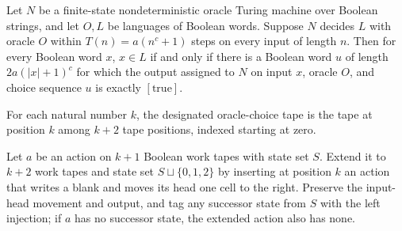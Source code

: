 \begin{theorem}
\label{Turing.FinOracleNDTM.mem_iff_exists_choiceOut}
\leanok
{}
Let $N$ be a finite-state nondeterministic oracle Turing machine over Boolean strings,
and let $O,L$ be languages of Boolean words. Suppose $N$ decides $L$ with oracle $O$
within $T(n)=a(n^c+1)$ steps on every input of length $n$. Then for every Boolean word
$x$, $x\in L$ if and only if there is a Boolean word $u$ of length $2a(|x|+1)^c$ for
which the output assigned to $N$ on input $x$, oracle $O$, and choice sequence $u$ is
exactly $[\mathrm{true}]$.
\end{theorem}

\begin{definition}
\label{Turing.oracleChoiceSlot}
\leanok
For each natural number $k$, the designated oracle-choice tape is the tape at position
$k$ among $k+2$ tape positions, indexed starting at zero.
\end{definition}

\begin{definition}
\label{Turing.oracleChoiceAction}
\leanok
{}
Let $a$ be an action on $k+1$ Boolean work tapes with state set $S$. Extend it to $k+2$
work tapes and state set $S\sqcup\{0,1,2\}$ by inserting at position $k$ an action that
writes a blank and moves its head one cell to the right. Preserve the input-head
movement and output, and tag any successor state from $S$ with the left injection; if
$a$ has no successor state, the extended action also has none.
\end{definition}


